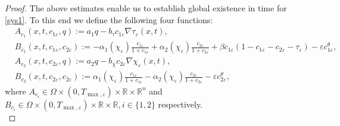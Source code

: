 \documentclass[a4paper,10pt]{article}
\theoremstyle{definition}
\begin{document}
\begin{proof}
\noindent
The above estimates enable us to establish global existence in time for \eqref{sys1}. To this end we define the following four functions:
\begin{align*}
  & A_{c_1}(x, t, c_{1\varepsilon}, q) := a_1 q - b_\tau c_{1\varepsilon} \nabla \tau_\varepsilon(x, t),          \\[5pt]
  & B_{c_1}(x, t, c_{1\varepsilon}, c_{2\varepsilon}) := - \alpha_1(\chi_\varepsilon)  \tfrac{c_{1\varepsilon}}{1 + c_{1\varepsilon}}   + \alpha_2(\chi_\varepsilon) \tfrac{c_{2\varepsilon}}{1 + c_{2\varepsilon}}
    + \beta c_{1\varepsilon}(1 - c_{1\varepsilon} - c_{2\varepsilon} - \tau_\varepsilon) - \varepsilon c_{1\varepsilon}^\theta,  \\[5pt]
  & A_{c_2}(x, t, c_{2\varepsilon}, q) := a_2 q - b_\chi c_{2\varepsilon} \nabla \chi_\varepsilon(x, t), \\[5pt]
  & B_{c_2}(x, t, c_{2\varepsilon}, c_{2\varepsilon}) :=  \alpha_1(\chi_\varepsilon) \tfrac{c_{1\varepsilon}}{1 + c_{1\varepsilon}}-\alpha_2(\chi_\varepsilon)  \tfrac{c_{2\varepsilon}}{1 + c_{2\varepsilon}} - \varepsilon c_{2\varepsilon}^\theta,
\end{align*}
where  $A_{c_i} \in \Omega \times (0, T_{\max, \varepsilon}) \times \mathbb{R} \times \mathbb{R}^n$ and $B_{c_i} \in \Omega \times (0, T_{\max, \varepsilon}) \times \mathbb{R} \times \mathbb{R}, i \in \{1, 2\}$ respectively. \\[-1ex]


\end{proof}
\end{document}
